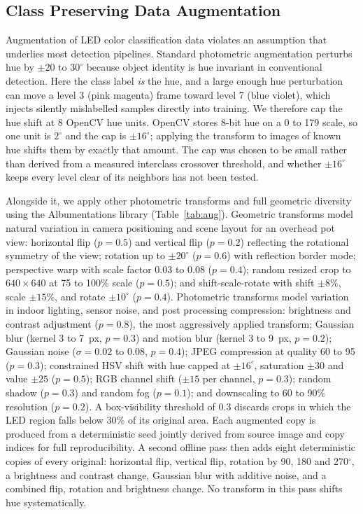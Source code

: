 ﻿\documentclass[journal]{IEEEtran}
\begin{document}
\subsection{Class Preserving Data Augmentation}
\label{sec:aug}
Augmentation of LED color classification data violates an assumption that underlies most detection pipelines. Standard photometric augmentation perturbs hue by $\pm 20$ to $30^{\circ}$ because object identity is hue invariant in conventional detection. Here the class label \emph{is} the hue, and a large enough hue perturbation can move a level 3 (pink magenta) frame toward level 7 (blue violet), which injects silently mislabelled samples directly into training. We therefore cap the hue shift at 8 OpenCV hue units. OpenCV stores 8-bit hue on a 0 to 179 scale, so one unit is $2^{\circ}$ and the cap is $\pm 16^{\circ}$; applying the transform to images of known hue shifts them by exactly that amount. The cap was chosen to be small rather than derived from a measured interclass crossover threshold, and whether $\pm 16^{\circ}$ keeps every level clear of its neighbors has not been tested.

Alongside it, we apply other photometric transforms and full geometric diversity using the Albumentations library (Table~\ref{tab:aug}). Geometric transforms model natural variation in camera positioning and scene layout for an overhead pot view: horizontal flip ($p=0.5$) and vertical flip ($p=0.2$) reflecting the rotational symmetry of the view; rotation up to $\pm 20^{\circ}$ ($p=0.6$) with reflection border mode; perspective warp with scale factor 0.03 to 0.08 ($p=0.4$); random resized crop to $640 \times 640$ at 75 to 100\% scale ($p=0.5$); and shift-scale-rotate with shift $\pm 8\%$, scale $\pm 15\%$, and rotate $\pm 10^{\circ}$ ($p=0.4$). Photometric transforms model variation in indoor lighting, sensor noise, and post processing compression: brightness and contrast adjustment ($p=0.8$), the most aggressively applied transform; Gaussian blur (kernel 3 to 7~px, $p=0.3$) and motion blur (kernel 3 to 9~px, $p=0.2$); Gaussian noise ($\sigma = 0.02$ to $0.08$, $p=0.4$); JPEG compression at quality 60 to 95 ($p=0.3$); constrained HSV shift with hue capped at $\pm 16^{\circ}$, saturation $\pm 30$ and value $\pm 25$ ($p=0.5$); RGB channel shift ($\pm 15$ per channel, $p=0.3$); random shadow ($p=0.3$) and random fog ($p=0.1$); and downscaling to 60 to 90\% resolution ($p=0.2$). A box-visibility threshold of 0.3 discards crops in which the LED region falls below 30\% of its original area. Each augmented copy is produced from a deterministic seed jointly derived from source image and copy indices for full reproducibility. A second offline pass then adds eight deterministic copies of every original: horizontal flip, vertical flip, rotation by 90, 180 and 270$^{\circ}$, a brightness and contrast change, Gaussian blur with additive noise, and a combined flip, rotation and brightness change. No transform in this pass shifts hue systematically.
\end{document}

